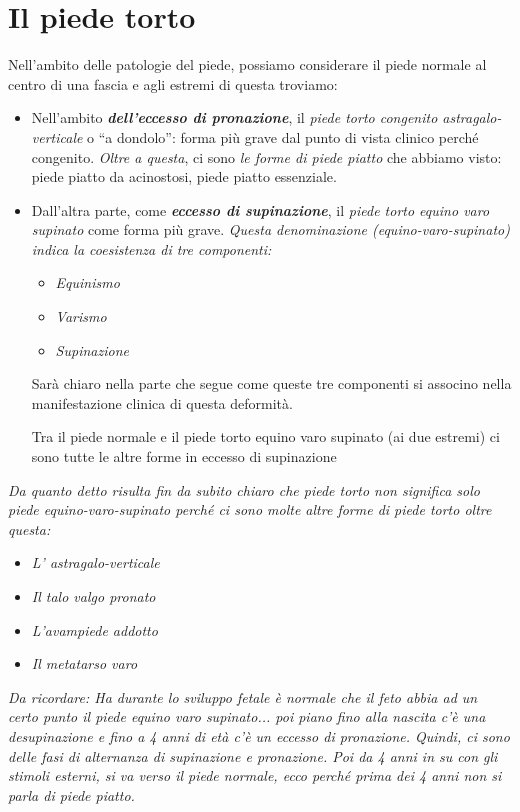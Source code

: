\section{Il piede torto}

Nell'ambito delle patologie del piede, possiamo considerare il piede normale al centro di una fascia e agli estremi di questa troviamo:

\begin{itemize}
\item
  Nell'ambito \textbf{\emph{dell'eccesso di pronazione}}, il \emph{piede torto congenito astragalo-verticale} o ``a dondolo'': forma più grave dal punto di vista clinico perché congenito.
\emph{Oltre a questa}, ci sono \emph{le forme di piede piatto} che abbiamo visto: piede piatto da acinostosi, piede piatto essenziale.
\item
  Dall'altra parte, come \textbf{\emph{eccesso di supinazione}}, il \emph{piede torto equino varo supinato} come forma più grave. \emph{Questa denominazione (equino-varo-supinato) indica la coesistenza di tre componenti:}

\begin{itemize}
\item
  \emph{Equinismo}
\item
  \emph{Varismo}
\item
  \emph{Supinazione}
\end{itemize}

Sarà chiaro nella parte che segue come queste tre componenti si associno nella manifestazione clinica di questa deformità.

Tra il piede normale e il piede torto equino varo supinato (ai due estremi) ci sono tutte le altre forme in eccesso di supinazione
\end{itemize}

\emph{Da quanto detto risulta fin da subito chiaro che piede torto non significa solo piede equino-varo-supinato perché ci sono molte altre forme di piede torto oltre questa:}

\begin{itemize}
\item
  \emph{L' astragalo-verticale}
\item
  \emph{Il talo valgo pronato}
\item
  \emph{L'avampiede addotto}
\item
  \emph{Il metatarso varo}
\end{itemize}

\emph{Da ricordare: Ha durante lo sviluppo fetale è normale che il feto abbia ad un certo punto il piede equino varo supinato... poi piano fino alla nascita c'è una desupinazione e fino a 4 anni di età c'è un eccesso di pronazione. Quindi, ci sono delle fasi di alternanza di supinazione e pronazione. Poi da 4 anni in su con gli stimoli esterni, si va verso il piede normale, ecco perché prima dei 4 anni non si parla di piede piatto.}

